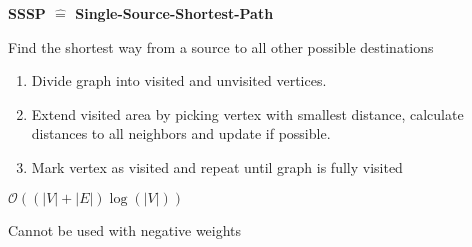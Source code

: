 \documentclass[aspectratio=169]{beamer}
\begin{document}
\begin{frame}
     \begin{tcbraster}[raster columns=2, raster equal height,
 raster every box/.style={size=small,valign=center,halign=center}]
 \begin{tcolorbox}[title=SSSP problem,colframe=red!50!black,colback=red!10!white]
 \textbf{SSSP $\widehat{=}$ Single-Source-Shortest-Path} \vspace{2mm}
 
 Find the shortest way from a source to all other possible destinations
 \end{tcolorbox}
 \begin{tcolorbox}[title=Dijkstra's algorithm,colframe=green!50!black,colback=green!10!white]
 \begin{enumerate}
     \item Divide graph into visited and unvisited vertices.
     \item Extend visited area by picking vertex with smallest distance, calculate
 distances to all neighbors and update if possible.
     \item Mark vertex as visited and repeat until graph is fully visited
 \end{enumerate}
 \end{tcolorbox}
 \end{tcbraster}
 \begin{tcbraster}[raster columns=2, raster equal height,
 raster every box/.style={size=small,valign=center,halign=center}]
 \begin{tcolorbox}[title=Running time,colframe=blue!50!black,colback=blue!10!white]
     $\mathcal{O}((|V| + |E|) \log(|V|))$
 \end{tcolorbox}
 \begin{tcolorbox}[title=Limitations,colframe=blue!50!black,colback=blue!10!white]
     Cannot be used with negative weights
 \end{tcolorbox}
 \end{tcbraster}
 \end{frame}
\end{document}
